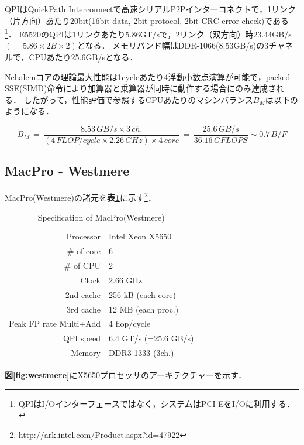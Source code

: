 QPIはQuickPath Interconnectで高速シリアルP2Pインターコネクトで，1リンク（片方向）あたり20bit(16bit-data, 2bit-protocol, 2bit-CRC error check)である\footnote{QPIはI/Oインターフェースではなく，システムはPCI-EをI/Oに利用する．}．
E5520のQPIは1リンクあたり5.86GT/sで，2リンク（双方向）時23.44GB/s$(=5.86\times 2B \times 2)$となる．
メモリバンド幅はDDR-1066(8.53GB/s)の3チャネルで，CPUあたり25.6GB/sとなる．

Nehalemコアの理論最大性能は1cycleあたり4浮動小数点演算が可能で，packed SSE(SIMD)命令により加算器と乗算器が同時に動作する場合にのみ達成される．
したがって，\hyperlink{tgt:perf prediction}{性能評価}で参照するCPUあたりのマシンバランス$B_M$は以下のようになる．

\begin{equation}
B_M \,=\, \frac{8.53\,GB/s \times 3\,ch.}{(4\,FLOP/cycle \times 2.26\,GHz) \times 4\,core} \,=\, \frac{25.6\,GB/s}{36.16\,GFLOPS} \sim 0.7\,B/F
\label{eq:B_M nehalem}
\end{equation}



%
\subsection{MacPro - Westmere}

MacPro(Westmere)の諸元を\textbf{表\ref{tbl:macpro-westmere}}に示す\footnote{\url{http://ark.intel.com/Product.aspx?id=47922}}．

\begin{table}[htdp]
\caption{Specification of MacPro(Westmere)}
\small
\begin{center}
\begin{tabular}{rl} \toprule
Processor & Intel Xeon X5650\\
\# of core & 6\\
\# of CPU & 2\\
Clock & 2.66 GHz\\
2nd cache & 256 kB (each core)\\
3rd cache & 12 MB (each proc.)\\
Peak FP rate Multi+Add & 4 flop/cycle\\
QPI speed & 6.4 GT/s (=25.6 GB/s)\\
Memory & DDR3-1333 (3ch.)\\ \bottomrule
\end{tabular}
\end{center}
\label{tbl:macpro-westmere}
\end{table}


\textbf{図\ref{fig:westmere}}にX5650プロセッサのアーキテクチャーを示す．

